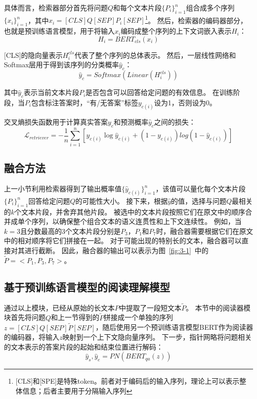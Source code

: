 具体而言，检索器部分首先将问题$Q$和每个文本片段$\{P_i\}^n_{i=1}$组合成多个序列$\{x_i\}^n_{i=1}$，其中$x_i=[CLS]Q[SEP]P_i[SEP]$\footnote{[CLS]和[SPE]是特殊token。前者对于编码后的输入序列，理论上可以表示整体信息；后者主要用于分隔输入序列}。
然后，检索器的编码器部分，也就是预训练语言模型，用于将输入$x_i$编码成整个序列的上下文词嵌入表示$H_i$：
\begin{equation}
    H_i = BERT_{cls}(x_i)
\end{equation}

[CLS]的隐向量表示$H^{cls}_i$代表了整个序列的总体表示。
然后，一层线性网络和Softmax层用于得到该序列的分类概率$\hat y_c$：
\begin{equation}
    \hat y_c=Softmax(Linear(H_i^{cls}))
\end{equation}

其中$\hat y_c$表示当前文本片段$P_i$是否包含可以回答给定问题的有效信息\cite{zhang2020retrospective}。
在训练阶段，当$P_i$包含标注答案时，“有/无答案”标签$y_{c(i)}$设为1，否则设为0。

交叉熵损失函数用于计算真实答案$y_c$和预测概率$\hat y_c$之间的损失：
\begin{equation}
    \mathcal  L_{retriever}  = -\frac{1}{n}\sum_{i=1}^{n}[y_{c(i)}\log\hat y_{c(i)}+(1-y_{c(i)})log(1-\hat y_{c(i)})]
\end{equation}

\subsection{融合方法}
上一小节利用检索器得到了输出概率值$\{\hat y_{c(i)}\}^n_{i=1}$，该值可以量化每个文本片段$\{P_i\}^n_{i=1}$回答给定问题$Q$的可能性大小。
接下来，根据$\hat y$的值，选择与问题$Q$最相关的$k$个文本片段，并舍弃其他片段。
被选中的文本片段按照它们在原文中的顺序合并成单个序列，以确保整个组合文本的语义连贯性和上下文连续性。
例如，当$k=3$且分数最高的3个文本片段分别是$P_3$，$P_1$和$P_7$时，融合器需要根据它们在原文中的相对顺序将它们拼接在一起。
对于可能出现的特别长的文本，融合器可以直接对其进行截断。
因此，融合器的输出可以表示为图~\ref{fig:3-1}~中的$\tilde P=<P_1,P_3,P_7>$。

\subsection{基于预训练语言模型的阅读理解模型}
通过以上模块，已经从原始的长文本$P$中提取了一段短文本$\tilde P$。
本节中的阅读器模块首先将问题$Q$和上一节得到的$\tilde P$拼接成一个单独的序列$z=[CLS]Q[SEP]\tilde P[SEP]$，随后使用另一个预训练语言模型BERT\cite{devlin2018bert}作为阅读器的编码器，将输入$z$映射到一个上下文隐向量序列。
下一步，指针网略将问题相关的文本表示的答案片段的起始和结束位置进行解码：
\begin{equation}
    \hat y_s,\hat y_e = PN(BERT_{qa}(z))
\end{equation}

